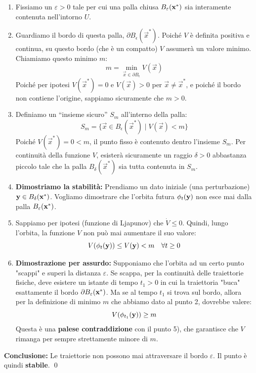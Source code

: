 \documentclass[openany]{book}
\theoremstyle{definition}
\theoremstyle{remark}
\begin{document}
\begin{enumerate}
    \item Fissiamo un $\varepsilon > 0$ tale per cui una palla chiusa $B_\varepsilon(\vb{x}^*)$ sia interamente contenuta nell'intorno $U$.
    \item Guardiamo il bordo di questa palla, $\partial B_\epsilon(\vec{x}^*)$. Poiché $V$ è definita positiva e continua, su questo bordo (che è un compatto) $V$ assumerà un valore minimo. Chiamiamo questo minimo $m$:
    \begin{equation*}
        m = \min_{\vec{x} \in \partial B_\epsilon} V(\vec{x})
    \end{equation*}
    Poiché per ipotesi $V(\vec{x}^*) = 0$ e $V(\vec{x}) > 0$ per $\vec{x} \neq \vec{x}^*$, e poiché il bordo non contiene l'origine, sappiamo sicuramente che $m > 0$.

    
    \item Definiamo un ``insieme sicuro'' $S_m$ all'interno della palla:
    \begin{equation*}
        S_m = \{ \vec{x} \in B_\epsilon(\vec{x}^*) \mid V(\vec{x}) < m \}
    \end{equation*}
    Poiché $V(\vec{x}^*) = 0 < m$, il punto fisso è contenuto dentro l'insieme $S_m$. Per continuità della funzione $V$, esisterà sicuramente un raggio $\delta > 0$ abbastanza piccolo tale che la palla $B_\delta(\vec{x}^*)$ sia tutta contenuta in $S_m$.
    
    \item \textbf{Dimostriamo la stabilità:} Prendiamo un dato iniziale (una perturbazione) $\vb{y} \in B_\delta(\vb{x}^*)$. Vogliamo dimostrare che l'orbita futura $\phi_t(\vb{y})$ non esce mai dalla palla $B_\varepsilon(\vb{x}^*)$.
    
    \item Sappiamo per ipotesi (funzione di Ljapunov) che $\dot{V} \le 0$. Quindi, lungo l'orbita, la funzione $V$ non può mai aumentare il suo valore:
    $$ V(\phi_t(\vb{y})) \le V(\vb{y}) < m \quad \forall t \ge 0 $$
    
    \item \textbf{Dimostrazione per assurdo:} Supponiamo che l'orbita ad un certo punto "scappi" e superi la distanza $\varepsilon$. 
    Se scappa, per la continuità delle traiettorie fisiche, deve esistere un istante di tempo $t_1 > 0$ in cui la traiettoria "buca" esattamente il bordo $\partial B_\varepsilon(\vb{x}^*)$.
    Ma se al tempo $t_1$ si trova sul bordo, allora per la definizione di minimo $m$ che abbiamo dato al punto 2, dovrebbe valere:
    $$ V(\phi_{t_1}(\vb{y})) \ge m $$
    Questa è una \textbf{palese contraddizione} con il punto 5), che garantisce che $V$ rimanga per sempre strettamente minore di $m$.
\end{enumerate}
\textbf{Conclusione:} Le traiettorie non possono mai attraversare il bordo $\varepsilon$. Il punto è quindi \textbf{stabile}. \qed
\end{document}

